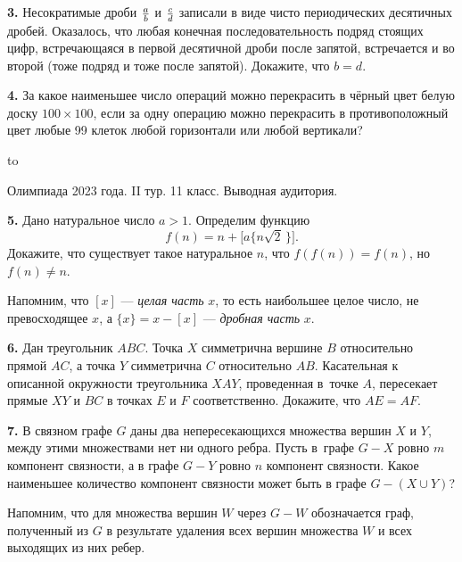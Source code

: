\documentclass[12pt]{article}
\def\q#1.{{\bf #1. }}
\def\dotline{\smallskip\hbox to \hsize{\dotfill}\medskip}
\begin{document}
\q3. Несократимые дроби $a\over b$ и $c\over d$ записали в виде чисто
периодических десятичных дробей. Оказалось, что любая конечная последовательность
подряд стоящих цифр, встречающаяся в первой десятичной дроби после запятой,
встречается и во второй (тоже подряд и тоже после запятой). Докажите, что $b=d$.

\q4. За какое наименьшее число операций можно перекрасить в чёрный цвет белую доску $100\times 100$, если за одну операцию можно перекрасить в противоположный цвет любые 99 клеток любой горизонтали или любой вертикали?

\dotline

\centerline{Олимпиада 2023 года. II тур. 11 класс. Выводная аудитория.}
\smallskip

\q5. Дано натуральное число $a>1$. Определим функцию
$$
f(n)=n+\bigl[a\{n\sqrt 2\,\}\bigr].
$$
Докажите, что существует такое натуральное $n$, что $f(f(n))=f(n)$, но $f(n)\ne n$. 

Напомним, что $[x]$ --- {\em целая часть} $x$, то есть  наибольшее целое число,  не превосходящее $x$, а $\{x\} = x-[x]$ --- {\em дробная  часть} $x$.

\q6. Дан треугольник $ABC$. Точка $X$ симметрична вершине $B$ относительно прямой $AC$, а точка $Y$ симметрична $C$ относительно $AB$. Касательная к описанной окружности треугольника $XAY$, проведенная в~точке $A$, пересекает прямые $XY$ и $BC$ в точках $E$ и $F$ соответственно. Докажите, что $AE=AF$.

\q7. В связном графе $G$ даны два непересекающихся множества вершин $X$ и $Y$, между этими множествами нет ни одного ребра. Пусть в~графе $G-X$ ровно $m$ компонент связности, а в графе $G-Y$ ровно $n$ компонент связности. Какое наименьшее количество компонент связности может быть в графе  $G-(X\cup Y)$?

Напомним, что для множества вершин $W$ через $G-W$ обозначается граф, полученный из $G$ в результате удаления всех вершин множества $W$ и всех выходящих из них ребер.
\end{document}
